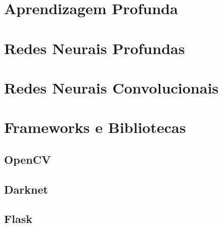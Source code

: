 

\section{Aprendizagem Profunda} \label{cap:fund-aprendizagem}

\section{Redes Neurais Profundas} \label{cap:fund-redes_profundas}

\section{Redes Neurais Convolucionais} \label{cap:fund-redes_convolucionais}

\section{Frameworks e Bibliotecas} \label{cap:fund-frameworks}

    \subsection{OpenCV} \label{cap:fund-frameworks-opencv}

    \subsection{Darknet} \label{cap:fund-frameworks-darknet}

    \subsection{Flask} \label{cap:fund-frameworks-flask}


\begin{comment}


\end{comment}
